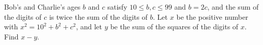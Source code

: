 Bob's and Charlie's ages $b$ and $c$ satisfy $10\le b,c\le99$ and $b=2c$, and the sum of the digits of $c$ is twice the sum of the digits of $b$. Let $x$ be the positive number with $x^2=10^2+b^2+c^2$, and let $y$ be the sum of the squares of the digits of $x$. Find $x-y$.
